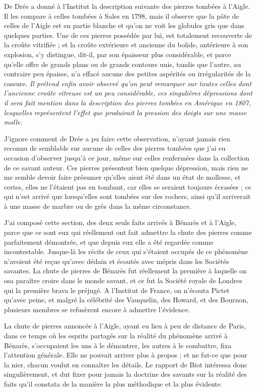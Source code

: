 \documentclass[a4paper, 12pt, oneside, french]{article}
\begin{document}
De Drée a donné à l'Institut la description suivante des pierres tombées à l'Aigle. Il les compare à celles tombées à Sales en 1798, mais il observe que la pâte de celles de l'Aigle est en partie blanche et qu'on ne voit les globules gris que dans quelques parties. Une de ces pierres possédée par lui, est totalement recouverte de la croûte vitrifiée ; et la croûte extérieure et ancienne du bolide, antérieure à son explosion, s'y distingue, dit-il, par son épaisseur plus considérable, et parce qu'elle offre de grands plans ou de grands contours unis, tandis que l'autre, au contraire peu épaisse, n'a effacé aucune des petites aspérités ou irrégularités de la cassure. \emph{Il prétend enfin avoir observé qu'on peut remarquer sur toutes celles dont l'ancienne croûte vitreuse est un peu considérable, ces singulières dépressions dont il sera fait mention dans la description des pierres tombées en Amérique en 1807, lesquelles représentent l'effet que produirait la pression des doigts sur une masse molle.}

J'ignore comment de Drée a pu faire cette observation, n'ayant jamais rien reconnu de semblable sur aucune de celles des pierres tombées que j'ai eu occasion d'observer jusqu'à ce jour, même sur celles renfermées dans la collection de ce savant auteur. Ces pierres présentent bien quelque dépression, mais rien ne me semble devoir faire présumer qu'elles aient été dans un état de mollesse, et certes, elles ne l'étaient pas en tombant, car elles se seraient toujours écrasées ; ce qui n'est arrivé que lorsqu'elles sont tombées sur des rochers, ainsi qu'il arriverait à une masse de marbre ou de grès dans la même circonstance.

J'ai composé cette section, des deux seuls faits arrivés à Bénarès et à l'Aigle, parce que ce sont eux qui réellement ont fait admettre la chute des pierres comme parfaitement démontrée, et que depuis eux elle a été regardée comme incontestable. Jusque-là les récits de ceux qui s'étaient occupés de ce phénomène n'avoient été reçus qu'avec dédain et écoutés avec mépris dans les Sociétés savantes. La chute de pierres de Bénarès fut réellement la première à laquelle on osa paraître croire dans le monde savant, et ce fut la Société royale de Londres qui la première brava le préjugé. A l'Institut de France, on n'écouta Pictet qu'avec peine, et malgré la célébrité des Vauquelin, des Howard, et des Bournon, plusieurs membres se refusèrent encore à admettre l'évidence.

La chute de pierres annoncée à l'Aigle, ayant eu lieu à peu de distance de Paris, dans ce temps où les esprits partagés sur la réalité du phénomène arrivé à Bénarès, s'occupaient les uns à le démontrer, les autres à le combattre, fixa l'attention générale. Elle ne pouvait arriver plus à propos ; et ne fut-ce que pour la nier, chacun voulut en connaître les détails. Le rapport de Biot intéressa donc singulièrement, et dut fixer pour jamais la doctrine des savants sur la réalité des faits qu'il constata de la manière la plus méthodique et la plus évidente.
\end{document}
